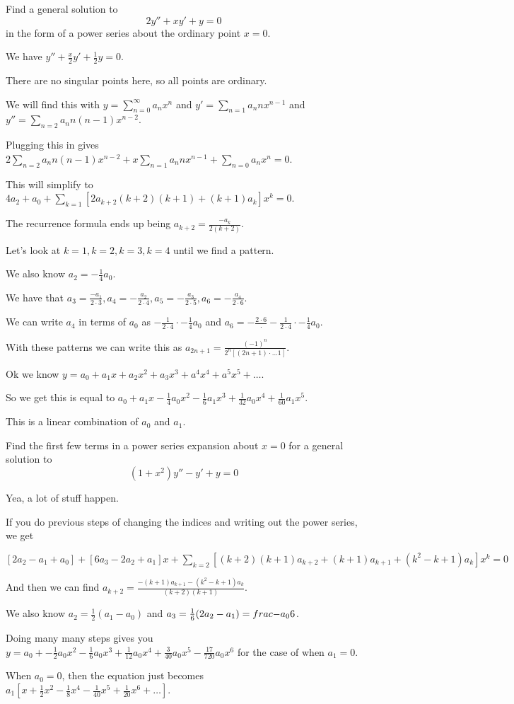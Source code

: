 \documentclass[../diffeq.tex]{subfiles}
\begin{document}
\begin{example}
    Find a general solution to 
    \[ 2y''+xy'+y=0\]
    in the form of a power series about the ordinary point $x=0$.

    We have $y''+\frac{x}{2}y'+\frac{1}{2}y=0$.

    There are no singular points here, so all points are ordinary.

    We will find this with $y=\sum_{n=0}^{\infty}a_nx^n$ and $y'=\sum_{n=1}a_nnx^{n-1}$ and $y''=\sum_{n=2}a_nn(n-1)x^{n-2}$.

    Plugging this in gives $2\sum_{n=2}a_nn(n-1)x^{n-2}+x\sum_{n=1}a_nnx^{n-1}+\sum_{n=0}a_nx^n =0$.

    This will simplify to $4a_2+a_0+\sum_{k=1}[2a_{k+2}(k+2)(k+1)+(k+1)a_k]x^k =0$.

    The recurrence formula ends up being $a_{k+2}=\frac{-a_k}{2(k+2)}$.

    Let's look at $k=1, k=2,k=3,k=4$ until we find a pattern.

    We also know $a_2=-\frac{1}{4}a_0$.

    We have that $a_3=\frac{-a_1}{2\cdot 3}, a_4=-\frac{a_2}{2\cdot 4}, a_5 = -\frac{a_3}{2\cdot 5}, a_6=-\frac{a_4}{2\cdot 6}$.

    We can write $a_4$ in terms of $a_0$ as $-\frac{1}{2\cdot 4}\cdot -\frac{1}{4}a_0$ and $a_6=-\frac{2\cdot 6}\cdot -\frac{1}{2\cdot 4}\cdot -\frac{1}{4}a_0$.

    With these patterns we can write this as $a_{2n+1}=\frac{(-1)^n}{2^n[(2n+1)\cdot \dots 1]}$.

    Ok we know $y=a_0+a_1x+a_2x^2+a_3x^3+a^4x^4+a^5x^5+\dots$.

    So we get this is equal to $a_0+a_1x-\frac{1}{4}a_0x^2-\frac{1}{6}a_1x^3+\frac{1}{32}a_0x^4+\frac{1}{60}a_1x^5$.

    This is a linear combination of $a_0$ and $a_1$.
\end{example}

\begin{example}
    Find the first few terms in a power series expansion about $x=0$ for a general solution to 
    \[ (1+x^2)y''-y'+y=0 \]

    Yea, a lot of stuff happen.

    If you do previous steps of changing the indices and writing out the power series, we get 

    $[2a_2-a_1+a_0]+[6a_3-2a_2+a_1]x+\sum_{k=2}[(k+2)(k+1)a_{k+2}+(k+1)a_{k+1}+(k^2-k+1)a_k]x^k=0$

    And then we can find $a_{k+2}=\frac{-(k+1)a_{k+1}-(k^2-k+1)a_k}{(k+2)(k+1)}$.

    We also know $a_2=\frac{1}{2}(a_1-a_0)$ and $a_3=\frac{1}{6}(2a_2-a_1)=\\frac{-a_0}{6}$.

    Doing many many steps gives you $y=a_0+-\frac{1}{2}a_0x^2-\frac{1}{6}a_0x^3+\frac{1}{12}a_0x^4+\frac{3}{40}a_0x^5-\frac{17}{720}a_0x^6$ for the case of when $a_1=0$.

    When $a_0=0$, then the equation just becomes $a_1[x+\frac{1}{2}x^2-\frac{1}{8}x^4-\frac{1}{40}x^5+\frac{1}{20}x^6+\dots]$.
\end{example}
\end{document}
